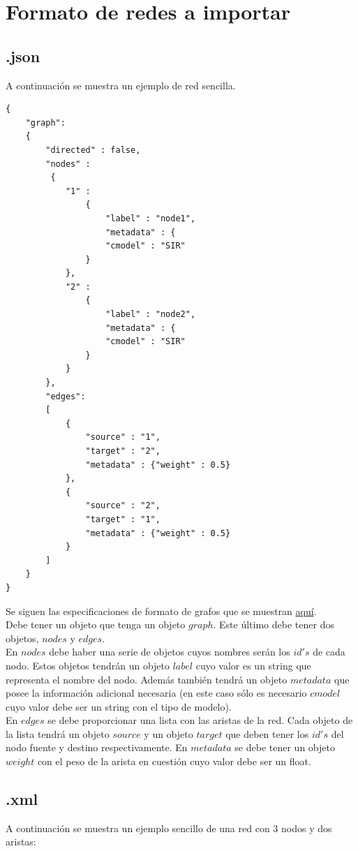 \documentclass[a4paper,12pt]{article}
\begin{document}
\section*{Formato de redes a importar}
\subsection*{.json}
A continuación se muestra un ejemplo de red sencilla.
\begin{lstlisting}
{
	"graph": 
	{
		"directed" : false,
		"nodes" :
		 {
			"1" : 
				{
					"label" : "node1",
					"metadata" : {
					"cmodel" : "SIR"
				}
			},
			"2" : 
				{
					"label" : "node2",
					"metadata" : {
					"cmodel" : "SIR"
				}
			}
		},
		"edges": 
		[
			{
				"source" : "1",
				"target" : "2",
				"metadata" : {"weight" : 0.5}
			},
			{
				"source" : "2",
				"target" : "1",
				"metadata" : {"weight" : 0.5}
			}
		]
	}
}
\end{lstlisting}
Se siguen las especificaciones de formato de grafos que se muestran \href{https://jsongraphformat.info/}{aquí}.\\
Debe tener un objeto que tenga un objeto $graph$. Este último debe tener dos objetos, $nodes$ y $edges$.\\
En $nodes$ debe haber una serie de objetos cuyos nombres serán los $id's$ de cada nodo. Estos objetos tendrán un objeto $label$ cuyo valor es un string que representa el nombre del nodo. Además también tendrá un objeto $metadata$ que posee la información adicional necesaria (en este caso sólo es necesario $cmodel$ cuyo valor debe ser un string con el tipo de modelo).\\
En $edges$ se debe proporcionar una lista con las aristas de la red. Cada objeto de la lista tendrá un objeto $source$ y un objeto $target$ que deben tener los $id's$ del nodo fuente y destino respectivamente. En $metadata$ se debe tener un objeto $weight$ con el peso de la arista en cuestión cuyo valor debe ser un float.

\subsection*{.xml}
A continuación se muestra un ejemplo sencillo de una red con 3 nodos y dos aristas:
\end{document}
